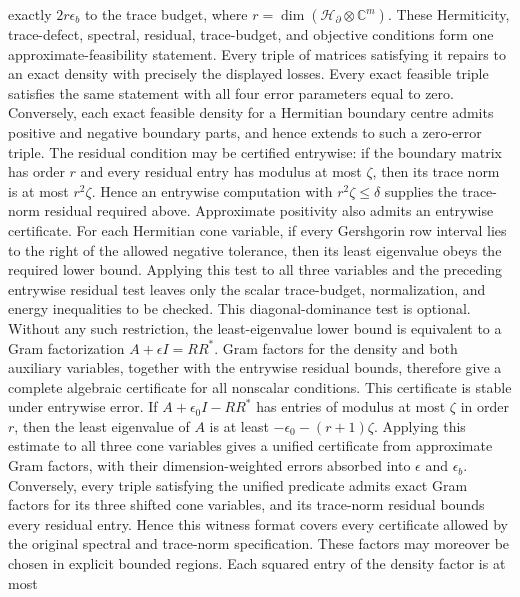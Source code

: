 \begin{lemma}
    exactly $2r\epsilon_b$ to the trace budget, where
    $r=\dim(\mathcal H_{\partial}\otimes\mathbb C^m)$.
    These Hermiticity, trace-defect, spectral, residual, trace-budget, and
    objective conditions form one approximate-feasibility statement.  Every
    triple of matrices satisfying it repairs to an exact density with
    precisely the displayed losses.  Every exact feasible triple satisfies
    the same statement with all four error parameters equal to zero.
    Conversely, each exact feasible density for a Hermitian boundary centre
    admits positive and negative boundary parts, and hence extends to such a
    zero-error triple.
    The residual condition may be certified entrywise: if the boundary matrix
    has order $r$ and every residual entry has modulus at most $\zeta$, then
    its trace norm is at most $r^2\zeta$.  Hence an entrywise computation with
    $r^2\zeta\le\delta$ supplies the trace-norm residual required above.
    Approximate positivity also admits an entrywise certificate.  For each
    Hermitian cone variable, if every Gershgorin row interval lies to the
    right of the allowed negative tolerance, then its least eigenvalue obeys
    the required lower bound.  Applying this test to all three variables and
    the preceding entrywise residual test leaves only the scalar trace-budget,
    normalization, and energy inequalities to be checked.
    This diagonal-dominance test is optional.  Without any such restriction,
    the least-eigenvalue lower bound is equivalent to a Gram factorization
    $A+\epsilon I=RR^*$.  Gram factors for the density and both auxiliary
    variables, together with the entrywise residual bounds, therefore give a
    complete algebraic certificate for all nonscalar conditions.
    This certificate is stable under entrywise error.  If
    $A+\epsilon_0I-RR^*$ has entries of modulus at most $\zeta$ in order
    $r$, then the least eigenvalue of $A$ is at least
    $-\epsilon_0-(r+1)\zeta$.  Applying this estimate to all three cone
    variables gives a unified certificate from approximate Gram factors, with
    their dimension-weighted errors absorbed into $\epsilon$ and
    $\epsilon_b$.
    Conversely, every triple satisfying the unified predicate admits exact
    Gram factors for its three shifted cone variables, and its trace-norm
    residual bounds every residual entry.  Hence this witness format covers
    every certificate allowed by the original spectral and trace-norm
    specification.  These factors may moreover be chosen in explicit bounded
    regions.  Each squared entry of the density factor is at most

\end{lemma}
